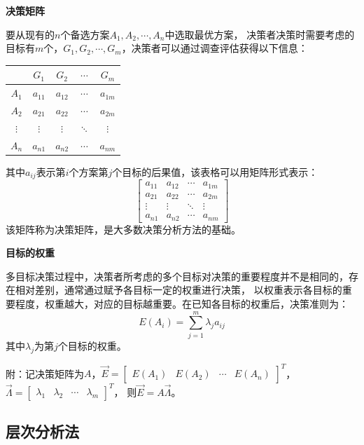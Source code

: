 \documentclass[a4paper,12pt]{article}
\begin{document}
\noindent
\textbf{决策矩阵}
 
要从现有的$n$个备选方案$A_1,A_2,\cdots,A_n$中选取最优方案，
决策者决策时需要考虑的目标有$m$个，$G_1,G_2,\cdots,G_m$，决策者可以通过调查评估获得以下信息：
\begin{center}
    \begin{tabular}{|c|c|c|c|c|}
        \hline
                 & $G_1$    & $G_2$    & $\cdots$ & $G_m$    \\ \hline
        $A_1$    & $a_{11}$ & $a_{12}$ & $\cdots$ & $a_{1m}$ \\ \hline
        $A_2$    & $a_{21}$ & $a_{22}$ & $\cdots$ & $a_{2m}$ \\ \hline
        $\vdots$ & $\vdots$ & $\vdots$ & $\ddots$ & $\vdots$ \\ \hline
        $A_n$    & $a_{n1}$ & $a_{n2}$ & $\cdots$ & $a_{nm}$ \\ \hline
    \end{tabular}
\end{center}
其中$a_{ij}$表示第$i$个方案第$j$个目标的后果值，该表格可以用矩阵形式表示：
$$
\begin{bmatrix}a_{11} & a_{12} & \cdots & a_{1m} \\
    a_{21} & a_{22} & \cdots & a_{2m} \\
    \vdots & \vdots & \ddots & \vdots \\
    a_{n1} & a_{n2} & \cdots & a_{nm}
\end{bmatrix}
$$
该矩阵称为决策矩阵，是大多数决策分析方法的基础。

\noindent
\textbf{目标的权重}

多目标决策过程中，决策者所考虑的多个目标对决策的重要程度并不是相同的，存在相对差别，通常通过赋予各目标一定的权重进行决策，
以权重表示各目标的重要程度，权重越大，对应的目标越重要。在已知各目标的权重后，决策准则为：
$$
E\left(A_i\right)=\sum_{j=1}^m\lambda_ja_{ij}
$$
其中$\lambda_j$为第$j$个目标的权重。

附：记决策矩阵为$A$，$\overrightarrow E=\begin{bmatrix}E(A_1) & E(A_2) & \cdots & E(A_n)\end{bmatrix}^T$，
$\overrightarrow \Lambda=\begin{bmatrix}\lambda_1 & \lambda_2 & \cdots & \lambda_m\end{bmatrix}^T$，
则$\overrightarrow E=A\overrightarrow\Lambda$。

\subsection{层次分析法}
\end{document}
